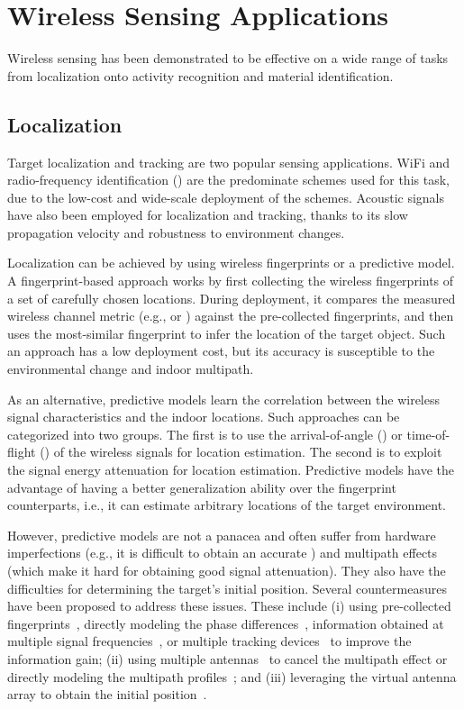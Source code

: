 \section{Wireless Sensing Applications}
Wireless sensing has been demonstrated to be effective on a wide range of tasks from localization onto activity recognition and material
identification.


\subsection{Localization} Target localization and tracking are two popular sensing applications. WiFi and radio-frequency
identification (\RFID) are the predominate schemes used for this task, due to the low-cost and wide-scale deployment of the schemes.
Acoustic signals have also been employed for localization and tracking, thanks to its slow propagation velocity and robustness to
environment changes.

 Localization can be achieved by using wireless fingerprints or a predictive model. A fingerprint-based approach works
by first collecting the wireless fingerprints of a set of carefully chosen locations. During deployment, it compares the measured wireless
channel metric (e.g., \RSSI or \CSI) against the pre-collected fingerprints, and then uses the most-similar fingerprint to infer the
location of the target object. Such an approach has a low deployment cost, but its accuracy is susceptible to the environmental change and
indoor multipath.

As an alternative, predictive models learn the correlation between the wireless signal characteristics and the indoor locations. Such
approaches can be categorized into two groups. The first is to use the arrival-of-angle (\AoA) or time-of-flight (\TOF) of the wireless
signals for location estimation. The second is to exploit the signal energy attenuation for location estimation. Predictive models have the
advantage of having a better generalization ability over the fingerprint counterparts, i.e., it can estimate arbitrary locations of the
target environment.

However, predictive models are not a panacea and often suffer from hardware imperfections (e.g., it is difficult to obtain an accurate
\TOF) and multipath effects (which make it hard for obtaining good signal attenuation). They also have the difficulties for determining the
target's initial position. Several countermeasures have been proposed to address these issues. These include (i) using pre-collected
fingerprints~\cite{Wang2016D}, directly modeling the phase differences~\cite{LLAP},  information obtained at multiple signal
frequencies~\cite{RFind,CAT,STRATA}, or multiple tracking devices~\cite{BeepBeep} to improve the information gain; (ii) using multiple
antennas~\cite{Arraytrack, Spotfi} to cancel the multipath effect or directly modeling the multipath profiles~\cite{PinIt}; and (iii)
leveraging the virtual antenna array to obtain the initial position~\cite{Tagoram}.


